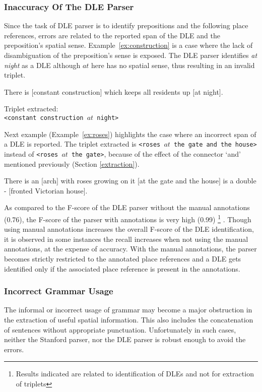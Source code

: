 \documentclass{sig-alternate}
\begin{document}
\subsubsection{Inaccuracy Of The DLE Parser}
Since the task of DLE parser is to identify prepositions and the following place references, errors are related to the reported span of the DLE and the preposition's spatial sense. Example~\ref{ex:construction} is a case where the lack of disambiguation of the preposition's sense is exposed. The DLE parser identifies \textit{at night} as a DLE although $at$ here has no spatial sense, thus resulting in an invalid triplet. 
\label{subsub:DLE}
\begin{example}
\label{ex:construction}
There is $[$constant construction$]$ which keeps all residents up $[$at night$]$. 
\end{example}
Triplet extracted:\\
\texttt{<constant construction $at$ night>}

Next example (Example~\ref{ex:roses}) highlights the case where an incorrect span of a DLE is reported. The triplet extracted is \texttt{<roses $at$ the gate and the house>} instead of \texttt{<roses $at$ the gate>}, because of the effect of the connector `and' mentioned previously (Section \ref{extraction}). 
\begin{example}
\label{ex:roses}
There is an $[$arch$]$ with roses growing on it $[$at the gate and the house$]$ is a double - $[$fronted Victorian house$]$.
\end{example}
As compared to the F-score of the DLE parser without the manual annotations (0.76), the F-score of the parser with annotations is very high (0.99) \footnote{Results indicated are related to identification of DLEs and not for extraction of triplets} \cite{fei:locative}.
Though using manual annotations increases the overall F-score of the DLE identification, it is observed in some instances the recall increases when not using the manual annotations, at the expense of accuracy. With the manual annotations, the parser becomes strictly restricted to the annotated place references and a DLE gets identified only if the associated place reference is present in the annotations. 
\subsubsection{Incorrect Grammar Usage}
The informal or incorrect usage of grammar may become a major obstruction in the extraction of useful spatial information. This also includes the concatenation of sentences without appropriate punctuation. Unfortunately in such cases, neither the Stanford parser, nor the DLE parser is robust enough to avoid the errors.
\end{document}
